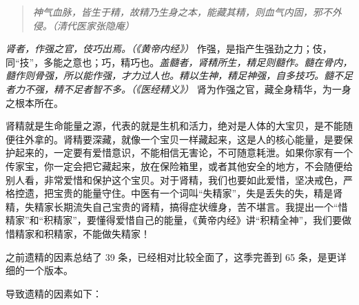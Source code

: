 \begin{quote}\it
    神气血脉，皆生于精，故精乃生身之本，能藏其精，则血气内固，邪不外侵。（清代医家张隐庵）
\end{quote}

\textit{肾者，作强之官，伎巧出焉。（《黄帝内经》）} 作强，是指产生强劲之力；伎，同“技”，多能之意也；巧，精巧也。\textit{盖髓者，肾精所生，精足则髓作。髓在骨内，髓作则骨强，所以能作强，才力过人也。精以生神，精足神强，自多技巧。髓不足者力不强，精不足者智不多。（《医经精义》）} 肾为作强之官，藏全身精华，为一身之根本所在。

肾精就是生命能量之源，代表的就是生机和活力，绝对是人体的大宝贝，是不能随便往外拿的。肾精要深藏，就像一个宝贝一样藏起来，这是人的核心能量，是要保护起来的，一定要有爱惜意识，不能相信无害论，不可随意耗泄。如果你家有一个传家宝，你一定会把它藏起来，放在保险箱里，或者其他安全的地方，不会随便给别人看，非常爱惜和保护这个宝贝。对于肾精，我们也要如此爱惜，坚决戒色，严格控遗，把宝贵的能量守住。中医有一个词叫“失精家”，失是丢失的失，精是肾精，失精家长期流失自己宝贵的肾精，搞得症状缠身，苦不堪言。我提出一个“惜精家”和“积精家”，要懂得爱惜自己的能量，《黄帝内经》讲“积精全神”，我们要做惜精家和积精家，不能做失精家！

之前遗精的因素总结了 39 条，已经相对比较全面了，这季完善到 65 条，是更详细的一个版本。

导致遗精的因素如下：

